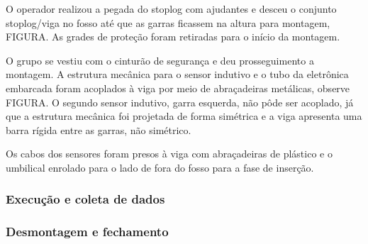 O operador realizou a pegada do stoplog com ajudantes e desceu o conjunto
stoplog/viga no fosso até que as garras ficassem na altura para montagem,
FIGURA.
As grades de proteção foram retiradas para o início da montagem.

O grupo se vestiu com o cinturão de segurança e deu prosseguimento a
montagem. A estrutura mecânica para o sensor indutivo e o
tubo da eletrônica embarcada foram acoplados à viga por meio de abraçadeiras
metálicas, observe FIGURA. O segundo sensor indutivo, garra esquerda, não pôde
ser acoplado, já que a estrutura mecânica foi projetada de forma simétrica e a
viga apresenta uma barra rígida entre as garras, não simétrico.

Os cabos dos sensores foram presos à viga com abraçadeiras de plástico e o
umbilical enrolado para o lado de fora do fosso para a fase de inserção.



\subsubsection{Execução e coleta de dados}
\subsubsection{Desmontagem e fechamento}

\label{metodos}


